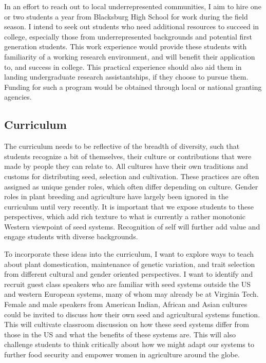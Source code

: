 \documentclass[11pt]{article}
\begin{document}
In an effort to reach out to local underrepresented communities, I aim to hire one or two students a year from Blacksburg High School for work during the field season. I intend to seek out students who need additional resources to succeed in college, especially those from underrepresented backgrounds and potential first generation students. This work experience would provide these students with familiarity of a working research environment, and will benefit their application to, and success in college. This practical experience should also aid them in landing undergraduate research assistantships, if they choose to pursue them. Funding for such a program would be obtained through local or national granting agencies.

\subsection*{Curriculum}

The curriculum needs to be reflective of the breadth of diversity, such that students recognize a bit of themselves, their culture or contributions that were made by people they can relate to. All cultures have their own traditions and customs for distributing seed, selection and cultivation. These practices are often assigned as unique gender roles, which often differ depending on culture. Gender roles in plant breeding and agriculture have largely been ignored in the curriculum until very recently. It is important that we expose students to these perspectives, which add rich texture to what is currently a rather monotonic Western viewpoint of seed systems. Recognition of self will further add value and engage students with diverse backgrounds.

To incorporate these ideas into the curriculum, I want to explore ways to teach about plant domestication, maintenance of genetic variation, and trait selection from different cultural and gender oriented perspectives. I want to identify and recruit guest class speakers who are familiar with seed systems outside the US and western European systems, many of whom may already be at Virginia Tech. Female and male speakers from American Indian, African and Asian cultures could be invited to discuss how their own seed and agricultural systems function. This will cultivate classroom discussion on how these seed systems differ from those in the US and what the benefits of these systems are. This will also challenge students to think critically about how we might adapt our systems to further food security and empower women in agriculture around the globe. 
\end{document}
